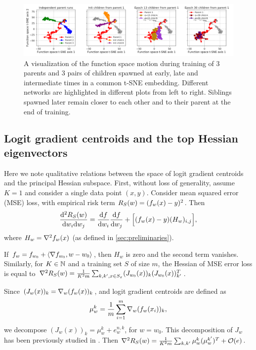 \documentclass{article}
\begin{document}
\begin{figure}[t!]
\centering
\includegraphics[width=1\linewidth]{figures/fn_BN_space_children_83669576.pdf}
\caption{A visualization of the function space motion during training of $3$ parents and $3$ pairs of children spawned at early, late and intermediate times in a common t-SNE embedding. Different networks are highlighted in different plots from left to right. Siblings spawned later remain closer to each other and to their parent at the end of training.}
\label{fig:tsne_bn_main}
\end{figure}

\subsection{Logit gradient centroids and the top Hessian eigenvectors}
\label{centroids_high_curvature}


Here we note qualitative relations between the space of logit gradient centroids and the principal Hessian subspace. 
First, without loss of generality, assume $K=1$ and consider a single data point $(x,y)$.
Consider mean squared error (MSE) loss, with empirical risk term $\Risk{S}{w} = (f_w(x) - y)^2$. Then
\[
\frac{\dee^2 \Risk{S}{w}}{ \dee w_i \dee w_j} = \frac{\dee f}{\dee w_i} \frac{\dee f}{\dee w_j} + \Big[  (f_w(x)-y) (H_w)_{i,j} \Big] ,
\]
where 
$H_w = \nabla^2 f_w(x)$ (as defined in \cref{sec:preliminaries}).

If $f_w = f_{w_0} + \langle \nabla f_{w_0},w-w_0\rangle$, then $H_w$ is zero and the second term vanishes. 
Similarly, for $K \in \mathbb{N}$ and a training set $S$ of size $m$,  the Hessian of MSE error loss is equal to $\grad^2 \Risk{S}{w} = \frac{1}{K^2 m} \sum_{k,k',x\in S_x}  (J_{w_0}(x))_k (J_{w_0}(x))_{k'}^T$.

Since $(J_w(x))_k = \nabla_w (f_w(x))_k $, and logit gradient centroids are defined as
\[
\mu_w^k = \frac 1 m \sum_{i=1}^m \nabla_w (f_w(x_i))_k,
\]
we decompose $(J_w(x))_k = \mu_w^k + e_w^{n,k}$, for $w=w_0$.
This decomposition of $J_w$  has been previously studied in \citep{fort2019emergent,papyan2019measurements}.
Then $\grad^2 \Risk{S}{w} = \frac{1}{K^2 m}  \sum_{k,k'} \mu_w^k (\mu_w^{k'})^T + \mathcal{O}(e) $.
\end{document}
